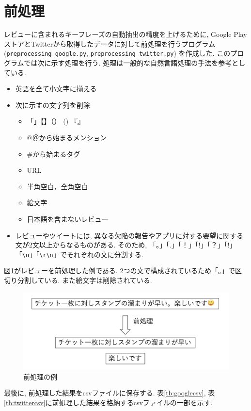 \section{前処理}\label{preprocessing}
レビューに含まれるキーフレーズの自動抽出の精度を上げるために, Google PlayストアとTwitterから取得したデータに対して前処理を行うプログラム (\verb|preprocessing_google.py|, \verb|preprocessing_twitter.py|) を作成した. このプログラムでは次に示す処理を行う. 処理は一般的な自然言語処理の手法を参考としている. 
\begin{itemize}
  \item 英語を全て小文字に揃える
  \item 次に示すの文字列を削除
    \begin{itemize}
      \item 「」【】（） () 『』
      \item @＠から始まるメンション
      \item \#から始まるタグ
      \item URL
      \item 半角空白，全角空白
      \item 絵文字
      \item 日本語を含まないレビュー
    \end{itemize}
  \item レビューやツイートには, 異なる欠陥の報告やアプリに対する要望に関する文が2文以上からなるものがある. そのため, 「。」「.」「！」「!」「？」「!」「\verb|\n|」「\verb|\r\n|」でそれぞれの文に分割する. 
\end{itemize}
図\ref{fig:preprocessing}がレビューを前処理した例である. 2つの文で構成されているため「。」で区切り分割している. また絵文字は削除されている. 

\begin{figure}[H]
 \centering
 \includegraphics[scale=0.5]
      {contents/images/preprocessing.png}
 \caption{前処理の例\label{fig:preprocessing}}
\end{figure}

最後に, 前処理した結果をcsvファイルに保存する. 
表\ref{tb:googlecsv}, 表\ref{tb:twittercsv}に前処理した結果を格納するcsvファイルの一部を示す. 

